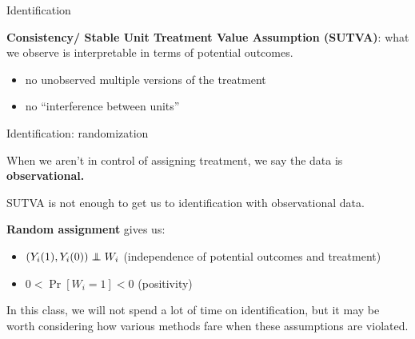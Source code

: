 \documentclass[xcolor={dvipsnames}, handout]{beamer}
\begin{document}

\begin{frame}{Identification}

\begin{wideitemize}
\item \textbf{Consistency/ Stable Unit Treatment Value Assumption (SUTVA)}: what we observe is interpretable in terms of potential outcomes. \pause
\begin{itemize}
\item no unobserved multiple versions of the treatment
\item no ``interference between units''
\end{itemize}
\end{wideitemize}

\end{frame}



\begin{frame}{Identification: randomization}

\begin{wideitemize}
\item When we aren't in control of assigning treatment, we say the data is \textbf{observational.}
\item SUTVA is not enough to get us to identification with observational data. \pause
\item \textbf{Random assignment} gives us:  \pause
\begin{itemize}
\item $(Y_i(1), Y_i(0)) \independent W_i$ (independence of potential outcomes and treatment)
\item $0< \Pr[W_i = 1] <0$ (positivity)\pause
\end{itemize}
\item In this class, we will not spend a lot of time on identification, but it may be worth considering how various methods fare when these assumptions are violated. 
\end{wideitemize}

\end{frame}
\end{document}
